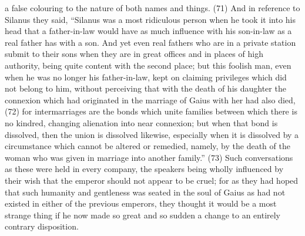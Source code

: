 a false colouring to the nature of both names and things. (71) And in reference to Silanus they
said, ``Silanus was a most ridiculous person when he took it into his head that a father-in-law would
have as much influence with his son-in-law as a real father has with a son. And yet even real
fathers who are in a private station submit to their sons when they are in great offices and in
places of high authority, being quite content with the second place; but this foolish man, even when
he was no longer his father-in-law, kept on claiming privileges which did not belong to him, without
perceiving that with the death of his daughter the connexion which had originated in the marriage of
Gaius with her had also died, (72) for intermarriages are the bonds which unite families between
which there is no kindred, changing alienation into near connexion; but when that bond is dissolved,
then the union is dissolved likewise, especially when it is dissolved by a circumstance which cannot
be altered or remedied, namely, by the death of the woman who was given in marriage into another
family.'' (73) Such conversations as these were held in every company, the speakers being wholly
influenced by their wish that the emperor should not appear to be cruel; for as they had hoped that
such humanity and gentleness was seated in the soul of Gaius as had not existed in either of the
previous emperors, they thought it would be a most strange thing if he now made so great and so
sudden a change to an entirely contrary disposition.

